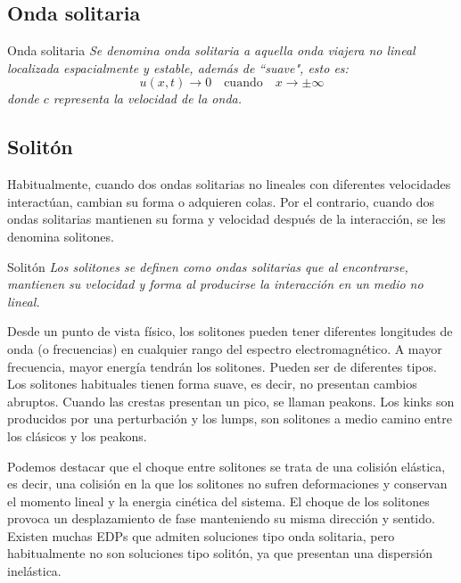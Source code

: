\subsection{Onda solitaria}

\begin{definicion1}[label={definicion},nameref={Title or anything else}]{Onda solitaria}
    \textit{Se denomina onda solitaria a aquella onda viajera no lineal localizada espacialmente y estable, además de ``suave", esto es:}
$$ u(x,t) \rightarrow 0 \quad \mbox{cuando} \quad x \rightarrow \pm \infty $$
\textit{donde $c$ representa la velocidad de la onda.}
\end{definicion1}


\subsection{Solitón}


Habitualmente, cuando dos ondas solitarias no lineales con diferentes velocidades interactúan, cambian su forma o adquieren colas. Por el contrario, cuando dos ondas solitarias mantienen su forma y velocidad después de la interacción, se les denomina solitones.

\begin{definicion1}[label={definicion},nameref={Title or anything else}]{Solitón}
    \textit{Los solitones se definen como ondas solitarias que al encontrarse, mantienen su velocidad y forma al producirse la interacción en un medio no lineal.}
\end{definicion1}

Desde un punto de vista físico, los solitones pueden tener diferentes longitudes de onda (o frecuencias) en cualquier rango del espectro electromagnético. A mayor frecuencia, mayor energía tendrán los solitones.
Pueden ser de diferentes tipos. Los solitones habituales tienen forma suave, es decir, no presentan cambios abruptos. Cuando las crestas presentan un pico, se llaman peakons. Los kinks son producidos por una perturbación y los lumps, son solitones a medio camino entre los clásicos y los peakons.

Podemos destacar que el choque entre solitones se trata de una colisión elástica, es decir, una colisión en la que los solitones no sufren deformaciones y conservan el momento lineal y la energia cinética del sistema. El choque de los solitones provoca un desplazamiento de fase manteniendo su misma dirección y sentido. Existen muchas EDPs que admiten soluciones tipo onda solitaria, pero habitualmente no son soluciones tipo solitón, ya que presentan una dispersión inelástica.


